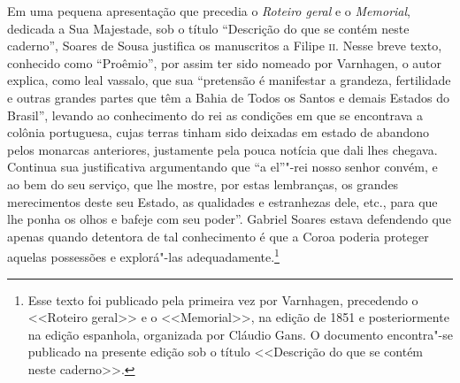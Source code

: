 \documentclass[12pt]{extarticle}
\begin{document}
{Em uma pequena apresentação que precedia o \textit{Roteiro geral} e o
\textit{Memorial}, dedicada a Sua Majestade, sob o título ``Descrição do
que se contém neste caderno'', Soares de Sousa justifica os manuscritos a
Filipe 	\textsc{ii}. Nesse breve texto, conhecido como ``Proêmio'', por assim ter
sido nomeado por Varnhagen, o autor explica, como leal vassalo, que sua
``pretensão é manifestar a grandeza, fertilidade e outras grandes partes
que têm a Bahia de Todos os Santos e demais Estados do Brasil'', levando
ao conhecimento do rei as condições em que se encontrava a colônia
portuguesa, cujas terras tinham sido deixadas em estado de abandono
pelos monarcas anteriores, justamente pela pouca notícia que dali lhes
chegava. Continua sua justificativa argumentando que ``a el''"-rei nosso
senhor convém, e ao bem do seu serviço, que lhe mostre, por estas
lembranças, os grandes merecimentos deste seu Estado, as qualidades e
estranhezas dele, etc., para que lhe ponha os olhos e bafeje com seu
poder''. Gabriel Soares estava defendendo que apenas quando detentora de
tal conhecimento é que a Coroa poderia proteger aquelas possessões e
explorá"-las adequadamente.\footnote{Esse texto foi publicado pela
primeira vez por Varnhagen, precedendo o <<Roteiro geral>> e o
<<Memorial>>, na edição de 1851 e posteriormente na edição espanhola,
organizada por Cláudio Gans. O documento encontra"-se publicado na presente edição
sob o título <<Descrição do que se contém neste caderno>>.}

}
\end{document}
